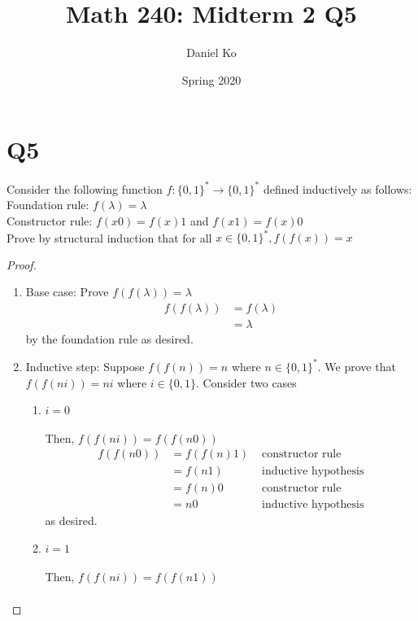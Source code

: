 \documentclass[11pt]{scrartcl}
\title{Math 240: Midterm 2 Q5}
\author{Daniel Ko}
\date{Spring 2020}
\begin{document}
\maketitle

\section{Q5}
Consider the following function $f:\{0,1\}^{*} \rightarrow\{0,1\}^{*}$ defined inductively as follows:\\
Foundation rule: $f(\lambda)=\lambda$\\
Constructor rule: $f(x 0)=f(x) 1$ and $f(x 1)=f(x) 0$\\
Prove by structural induction that for all $x \in\{0,1\}^{*}, f(f(x))=x$
\begin{proof}\
	\begin{enumerate}[label=\roman*.]
		\item{
		      Base case: Prove $f(f(\lambda))=\lambda$
		      \begin{align*}
			      f(f(\lambda)) & = f(\lambda) \\
			                    & = \lambda
		      \end{align*}
		      by the foundation rule as desired.
		      }
		\item{
		      Inductive step: Suppose $f(f(n))=n$ where $n \in \{0,1\}^{*}$.
		      We prove that $f(f(ni))=ni$ where $i \in\{0,1\}$. Consider two cases
		      \begin{enumerate}[label=\alph*.]
			      \item{
			            $i = 0$\\\-\\
			            Then, $f(f(ni))=f(f(n0))$
			            \begin{align*}
				            f(f(n0)) & = f(f(n)1) & \text { constructor rule}     \\
				                     & = f(n1)    & \text { inductive hypothesis} \\
				                     & = f(n)0    & \text { constructor rule}     \\
				                     & = n0       & \text { inductive hypothesis}
			            \end{align*}
			            as desired.
			            }
			      \item{
			            $i = 1$\\\-\\
			            Then, $f(f(ni))=f(f(n1))$
			            \begin{align*}

\end{align*}}
\end{enumerate}}
\end{enumerate}
\end{proof}
\end{document}
